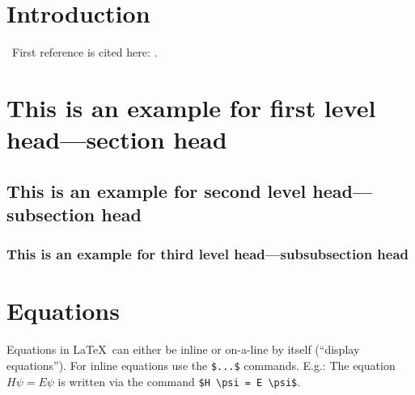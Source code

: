 \section{Introduction}\label{sec:intro}

\lipsum \, First reference is cited here: \cite{buschmann1998}. 


\section{This is an example for first level head---section head}

\subsection{This is an example for second level head---subsection head}\label{subsec:test1}

\subsubsection{This is an example for third level head---subsubsection head}\label{subsec:test2}

\lipsum[1-2]

\section{Equations}\label{sec:equations}

Equations in \LaTeX\ can either be inline or on-a-line by itself (``display equations''). For
inline equations use the \verb+$...$+ commands. E.g.: The equation
$H\psi = E \psi$ is written via the command \verb+$H \psi = E \psi$+.

